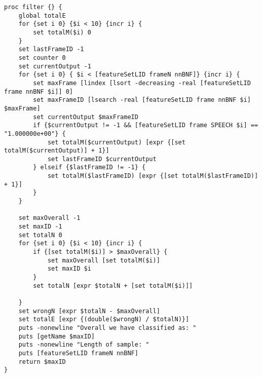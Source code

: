 \begin{lstlisting}[label=lst:SpeechFilter,caption=Speech Filter employed to smooth/improve output]
proc filter {} {
    global totalE
    for {set i 0} {$i < 10} {incr i} {
        set totalM($i) 0
    }
    set lastFrameID -1
    set counter 0
    set currentOutput -1
    for {set i 0} { $i < [featureSetLID frameN nnBNF]} {incr i} {
        set maxFrame [lindex [lsort -decreasing -real [featureSetLID frame nnBNF $i]] 0]
        set maxFrameID [lsearch -real [featureSetLID frame nnBNF $i] $maxFrame]
        set currentOutput $maxFrameID
        if {$currentOutput != -1 && [featureSetLID frame SPEECH $i] == "1.000000e+00"} {
            set totalM($currentOutput) [expr {[set totalM($currentOutput)] + 1}]
            set lastFrameID $currentOutput
        } elseif {$lastFrameID != -1} {
            set totalM($lastFrameID) [expr {[set totalM($lastFrameID)] + 1}]
        }
    }

    set maxOverall -1
    set maxID -1
    set totalN 0
    for {set i 0} {$i < 10} {incr i} {
        if {[set totalM($i)] > $maxOverall} {
            set maxOverall [set totalM($i)]
            set maxID $i
        }
        set totalN [expr $totalN + [set totalM($i)]]

    }
    set wrongN [expr $totalN - $maxOverall]
    set totalE [expr {(double($wrongN) / $totalN)}]
    puts -nonewline "Overall we have classified as: "
    puts [getName $maxID]
    puts -nonewline "Length of sample: "
    puts [featureSetLID frameN nnBNF]
    return $maxID
}
\end{lstlisting}
\newpage
